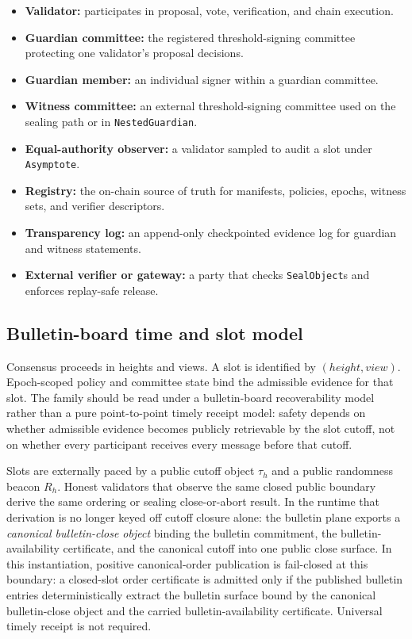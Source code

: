 \documentclass[11pt]{article}
\newcommand{\code}[1]{\texttt{#1}}
\newcommand{\term}[1]{\textit{#1}}
\begin{document}
\begin{itemize}[leftmargin=1.5em]
\item \textbf{Validator:} participates in proposal, vote, verification, and
chain execution.
\item \textbf{Guardian committee:} the registered threshold-signing committee
protecting one validator's proposal decisions.
\item \textbf{Guardian member:} an individual signer within a guardian
committee.
\item \textbf{Witness committee:} an external threshold-signing committee used
on the sealing path or in \code{NestedGuardian}.
\item \textbf{Equal-authority observer:} a validator sampled to audit a slot
under \code{Asymptote}.
\item \textbf{Registry:} the on-chain source of truth for manifests, policies,
epochs, witness sets, and verifier descriptors.
\item \textbf{Transparency log:} an append-only checkpointed evidence log for
guardian and witness statements.
\item \textbf{External verifier or gateway:} a party that checks
\code{SealObject}s and enforces replay-safe release.
\end{itemize}

\subsection{Bulletin-board time and slot model}

Consensus proceeds in heights and views. A slot is identified by
\((height, view)\). Epoch-scoped policy and committee state bind the
admissible evidence for that slot. The family should be read under a
bulletin-board recoverability model rather than a pure point-to-point timely
receipt model: safety depends on whether admissible evidence becomes publicly
retrievable by the slot cutoff, not on whether every participant receives every
message before that cutoff.

Slots are externally paced by a public cutoff object \(\tau_h\) and a public
randomness beacon \(R_h\). Honest validators that observe the same closed
public boundary derive the same ordering or sealing close-or-abort result. In
the runtime that derivation is no longer keyed off cutoff closure alone:
the bulletin plane exports a
\term{canonical bulletin-close object} binding the bulletin commitment, the
bulletin-availability certificate, and the canonical cutoff into one public
close surface. In this instantiation, positive canonical-order
publication is fail-closed at this boundary: a closed-slot order certificate is
admitted only if the published bulletin entries deterministically extract the
bulletin surface bound by the canonical bulletin-close object and the carried
bulletin-availability certificate. Universal timely receipt is not required.
\end{document}
